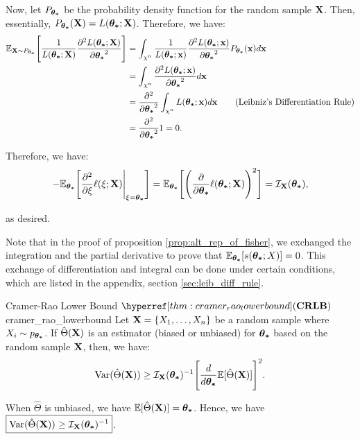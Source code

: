 \begin{proof*}
    \noindent Now, let $P_{\boldsymbol{\theta_*}}$ be the probability density function for the random sample ${\bf X}$. Then, essentially, $P_{\boldsymbol{\theta_*}}({\bf X}) = L(\boldsymbol{\theta_*};{\bf X})$. Therefore, we have:
    \begin{align*}
        \mathbb{E}_{{\bf X}\sim P_{\boldsymbol{\theta_*}}} \Bigg[ \frac{1}{L(\boldsymbol{\theta_*};{\bf X})}\frac{\partial^2 L(\boldsymbol{\theta_*};{\bf X})}{\partial\boldsymbol{\theta_*}^2} \Bigg] &= \int_{\chi^n} \frac{1}{L(\boldsymbol{\theta_*};{\bf x})}\frac{\partial^2 L(\boldsymbol{\theta_*};{\bf x})}{\partial\boldsymbol{\theta_*}^2} P_{\boldsymbol{\theta_*}}({\bf x}) d{\bf x} \\
        &= \int_{\chi^n}\frac{\partial^2 L(\boldsymbol{\theta_*};{\bf x})}{\partial\boldsymbol{\theta_*}^2} d{\bf x} \\
        &= \frac{\partial^2}{\partial\boldsymbol{\theta_*}^2}\int_{\chi^n} L(\boldsymbol{\theta_*};{\bf x})d{\bf x} \qquad \text{(Leibniz's Differentiation Rule)} \\
        &= \frac{\partial^2}{\partial\boldsymbol{\theta_*}^2} 1 = 0.
    \end{align*} 

    \noindent Therefore, we have:
    \begin{align*}
        -\mathbb{E}_{\boldsymbol{\theta_*}}\Bigg[ \frac{\partial^2}{\partial\xi}\ell(\xi;{\bf X})\Bigg|_{\xi=\boldsymbol{\theta_*}} \Bigg] = \mathbb{E}_{\boldsymbol{\theta_*}}\Bigg[ \Bigg( \frac{\partial}{\partial\boldsymbol{\theta_*}}\ell(\boldsymbol{\theta_*};{\bf X}) \Bigg)^2 \Bigg] = \mathcal{I}_{{\bf X}}(\boldsymbol{\theta_*}),
    \end{align*} 

    as desired.
\end{proof*} 

\begin{remark}
    Note that in the proof of proposition \ref{prop:alt_rep_of_fisher}, we exchanged the integration and the partial derivative to prove that $\mathbb{E}_{\boldsymbol{\theta_*}}[s(\boldsymbol{\theta_*};X)]=0$. This exchange of differentiation and integral can be done under certain conditions, which are listed in the appendix, section \ref{sec:leib_diff_rule}.
\end{remark}

\begin{theorem}{Cramer-Rao Lower Bound $\CRLB$}{cramer_rao_lowerbound}
    Let ${\bf X} = \{X_1, \dots, X_n\}$ be a random sample where $X_i \sim p_{\boldsymbol{\theta_*}}$. If $\hat\Theta({\bf X})$ is an estimator (biased or unbiased) for $\boldsymbol{\theta_*}$ based on the random sample ${\bf X}$, then, we have:
    \begin{equation}
        \mathrm{Var}(\hat\Theta({\bf X})) \ge \mathcal{I}_{{\bf X}}(\boldsymbol{\theta_*})^{-1}\Bigg[ \frac{d}{d\boldsymbol{\theta_*}}\mathbb{E}[\hat\Theta({\bf X})] \Bigg]^2. 
    \end{equation} 

    \noindent When $\hat\Theta$ is unbiased, we have $\mathbb{E}[\hat\Theta({\bf X})] = \boldsymbol{\theta_*}$. Hence, we have $\boxed{\mathrm{Var}(\hat\Theta({\bf X}))\ge\mathcal{I}_{{\bf X}}(\boldsymbol{\theta_*})^{-1}}$.
\end{theorem}

